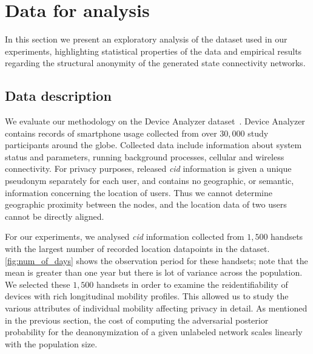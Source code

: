 \section{Data for analysis}

In this section we present an exploratory analysis of the dataset used in our experiments, highlighting statistical properties of the data and empirical results regarding the structural anonymity of the generated state connectivity networks.

\subsection{Data description}

We evaluate our methodology on the Device Analyzer dataset~\citep{Wagner2014}. Device Analyzer contains records of smartphone usage collected from over $ 30,000 $  study participants around the globe.
Collected data include information about system status and parameters, running background processes, cellular and wireless connectivity.
For privacy purposes, released \emph{cid} information is given a unique pseudonym separately for each user, and contains no geographic, or semantic, information concerning the location of users.
Thus we cannot determine geographic proximity between the nodes, and the location data of two users cannot be directly aligned.

For our experiments, we analysed \emph{cid} information collected from $1,500$ handsets with the largest number of recorded location datapoints in the dataset.
\cref{fig:num_of_days} shows the observation period for these handsets; note that the mean is greater than one year but there is lot of variance across the population.
We selected these $1,500$ handsets in order to examine the reidentifiability of devices with rich longitudinal mobility profiles.
This allowed us to study the various attributes of individual mobility affecting privacy in detail.
As mentioned in the previous section, the cost of computing the adversarial posterior probability for the deanonymization of a given unlabeled network scales linearly with the population size.


